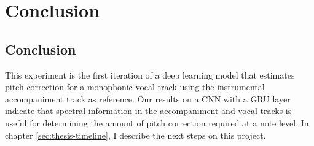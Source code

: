 \chapter{Conclusion}
\label{chap:conclusion}
\section{Conclusion}
This experiment is the first iteration of a deep learning model that estimates pitch correction for a monophonic vocal track using the instrumental accompaniment track as reference. Our results on a CNN with a GRU layer indicate that spectral information in the accompaniment and vocal tracks is useful for determining the amount of pitch correction required at a note level. In chapter \ref{sec:thesis-timeline}, I describe the next steps on this project.

